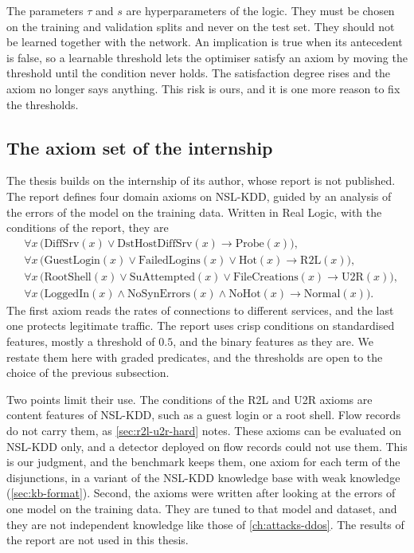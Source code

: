 The parameters $\tau$ and $s$ are hyperparameters of the logic. They must be
chosen on the training and validation splits and never on the test set. They
should not be learned together with the network. An implication is true when
its antecedent is false, so a learnable threshold lets the optimiser satisfy
an axiom by moving the threshold until the condition never holds. The
satisfaction degree rises and the axiom no longer says anything. This risk is
ours, and it is one more reason to fix the thresholds.

\subsection{The axiom set of the internship}
\label{sec:axiom-set-internship}

The thesis builds on the internship of its author, whose report is not
published. The report defines four domain axioms on NSL-KDD, guided by an
analysis of the errors of the model on the training data. Written in Real
Logic, with the conditions of the report, they are
\begin{align}
&\forall x\,\bigl(\mathrm{DiffSrv}(x)\vee\mathrm{DstHostDiffSrv}(x)\rightarrow
  \mathrm{Probe}(x)\bigr),\\
&\forall x\,\bigl(\mathrm{GuestLogin}(x)\vee\mathrm{FailedLogins}(x)\vee
  \mathrm{Hot}(x)\rightarrow\mathrm{R2L}(x)\bigr),\\
&\forall x\,\bigl(\mathrm{RootShell}(x)\vee\mathrm{SuAttempted}(x)\vee
  \mathrm{FileCreations}(x)\rightarrow\mathrm{U2R}(x)\bigr),\\
&\forall x\,\bigl(\mathrm{LoggedIn}(x)\wedge\mathrm{NoSynErrors}(x)\wedge
  \mathrm{NoHot}(x)\rightarrow\mathrm{Normal}(x)\bigr).
\end{align}
The first axiom reads the rates of connections to different services, and the
last one protects legitimate traffic. The report uses crisp conditions on
standardised features, mostly a threshold of $0.5$, and the binary features
as they are. We restate them here with graded predicates, and the
thresholds are open to the choice of the previous subsection.

Two points limit their use. The conditions of the R2L and U2R axioms are
content features of NSL-KDD, such as a guest login or a root shell. Flow
records do not carry them, as \cref{sec:r2l-u2r-hard} notes. These axioms can
be evaluated on NSL-KDD only, and a detector deployed on flow records could not
use them. This is our judgment, and the benchmark keeps them, one axiom for each term of
the disjunctions, in a variant of the NSL-KDD knowledge base with weak knowledge
(\cref{sec:kb-format}). Second, the axioms were written after looking at the errors of
one model on the training data. They are tuned to that model and dataset, and
they are not independent knowledge like those of \cref{ch:attacks-ddos}. The
results of the report are not used in this thesis.

